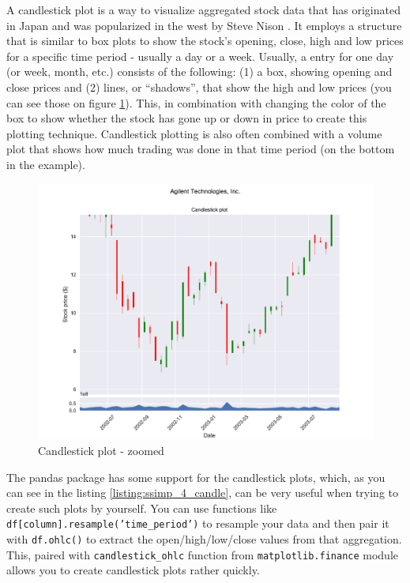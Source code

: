 \documentclass[12pt, a4paper]{article}
\begin{document}
A candlestick plot is a way to visualize aggregated stock data that has originated in Japan and was popularized in the west by Steve Nison \cite{candlestick}. It employs a structure that is similar to box plots to show the stock’s opening, close, high and low prices for a specific time period - usually a day or a week. Usually, a entry for one day (or week, month, etc.) consists of the following: (1) a box, showing opening and close prices and (2) lines, or “shadows”, that show the high and low prices (you can see those on figure \ref{fig:stock_candlestick_zoom}). This, in combination with changing the color of the box to show whether the stock has gone up or down in price to create this plotting technique. Candlestick plotting is also often combined with a volume plot that shows how much trading was done in that time period (on the bottom in the example).

\begin{figure}[H]
    \centering
    \includegraphics[width=\textwidth]{src/stocks/simple/candlestick_zoom}
    \caption{Candlestick plot - zoomed}
    \label{fig:stock_candlestick_zoom}
\end{figure}

The pandas package has some support for the candlestick plots, which, as you can see in the listing \ref{listing:ssimp_4_candle}, can be very useful when trying to create such plots by yourself.  You can use functions like \texttt{df[column].resample('time\_period')} to resample your data and then pair it with \texttt{df.ohlc()} to extract the open/high/low/close values from that aggregation. This, paired with \texttt{candlestick\_ohlc} function from \texttt{matplotlib.finance} module allows you to create candlestick plots rather quickly.
\end{document}

